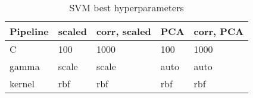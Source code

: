 \begin{table}[!htb]
\centering
\begin{tabular}{lllll}
\toprule
Pipeline & scaled & corr, scaled & PCA & corr, PCA \\
\midrule
C & 100 & 1000 & 100 & 1000 \\
gamma & scale & scale & auto & auto \\
kernel & rbf & rbf & rbf & rbf \\
\bottomrule
\end{tabular}
\caption{SVM best hyperparameters}
\label{table-svm-params}
\end{table}
